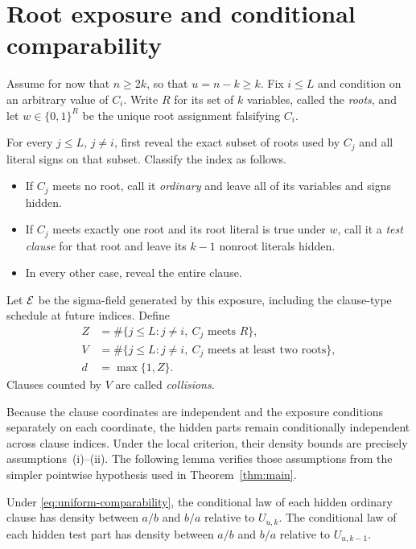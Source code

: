 \section{Root exposure and conditional comparability}
\label{sec:exposure}

Assume for now that $n\ge2k$, so that $u=n-k\ge k$.  Fix $i\le L$ and
condition on an arbitrary value of $C_i$.  Write $R$ for its set of $k$
variables, called the \emph{roots}, and let $w\in\{0,1\}^R$ be the unique
root assignment falsifying $C_i$.

For every $j\le L$, $j\ne i$, first reveal the exact subset of roots used
by $C_j$ and all literal signs on that subset.  Classify the index as
follows.
\begin{itemize}
\item If $C_j$ meets no root, call it \emph{ordinary} and leave all of its
      variables and signs hidden.
\item If $C_j$ meets exactly one root and its root literal is true under
      $w$, call it a \emph{test clause} for that root and leave its $k-1$
      nonroot literals hidden.
\item In every other case, reveal the entire clause.
\end{itemize}
Let $\mathcal E$ be the sigma-field generated by this exposure, including the
clause-type schedule at future indices.  Define
\begin{align}
    Z&=\#\{j\le L:j\ne i,\ C_j\text{ meets }R\},\label{eq:Z-definition}\\
    V&=\#\{j\le L:j\ne i,\ C_j\text{ meets at least two roots}\},
      \label{eq:V-definition}\\
    d&=\max\{1,Z\}.\label{eq:d-definition}
\end{align}
Clauses counted by $V$ are called \emph{collisions}.

Because the clause coordinates are independent and the exposure conditions
separately on each coordinate, the hidden parts remain conditionally
independent across clause indices.  Under the local criterion, their density
bounds are precisely assumptions~(i)--(ii).  The following lemma verifies
those assumptions from the simpler pointwise hypothesis used in
Theorem~\ref{thm:main}.

\begin{lemma}
\label{lem:conditional-comparability}
Under \eqref{eq:uniform-comparability}, the conditional law of each hidden
ordinary clause has density between $a/b$ and $b/a$ relative to $U_{u,k}$.
The conditional law of each hidden test part has density between $a/b$ and
$b/a$ relative to $U_{u,k-1}$.
\end{lemma}

